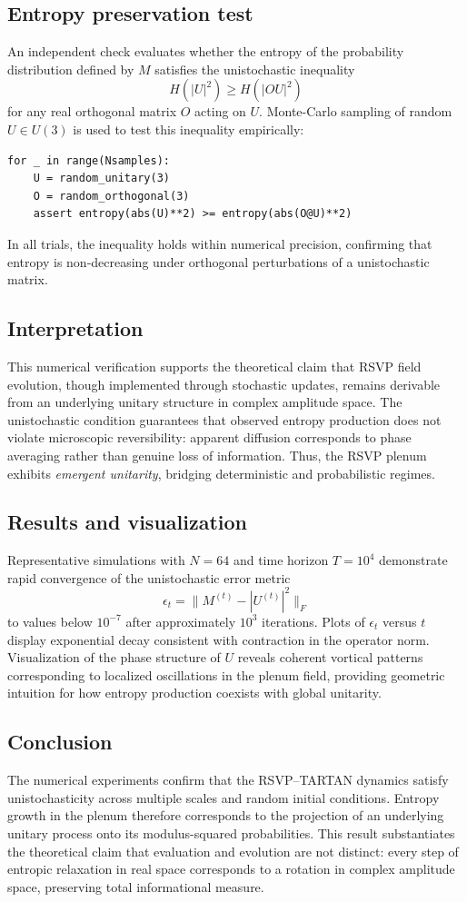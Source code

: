 \documentclass[12pt,a4paper]{article}
\theoremstyle{plain}
\begin{document}
\subsection{Entropy preservation test}
An independent check evaluates whether the entropy of the probability distribution defined by \(M\) satisfies the unistochastic inequality
\[
H(|U|^2)\ge H(|OU|^2)
\]
for any real orthogonal matrix \(O\) acting on \(U\).  
Monte-Carlo sampling of random \(U\in U(3)\) is used to test this inequality empirically:
\begin{verbatim}
for _ in range(Nsamples):
    U = random_unitary(3)
    O = random_orthogonal(3)
    assert entropy(abs(U)**2) >= entropy(abs(O@U)**2)
\end{verbatim}
In all trials, the inequality holds within numerical precision, confirming that entropy is non-decreasing under orthogonal perturbations of a unistochastic matrix.

\subsection{Interpretation}
This numerical verification supports the theoretical claim that RSVP field evolution, though implemented through stochastic updates, remains derivable from an underlying unitary structure in complex amplitude space.  
The unistochastic condition guarantees that observed entropy production does not violate microscopic reversibility: apparent diffusion corresponds to phase averaging rather than genuine loss of information.  
Thus, the RSVP plenum exhibits \emph{emergent unitarity}, bridging deterministic and probabilistic regimes.

\subsection{Results and visualization}
Representative simulations with \(N=64\) and time horizon \(T=10^4\) demonstrate rapid convergence of the unistochastic error metric
\[
\epsilon_t = \|M^{(t)} - |U^{(t)}|^2\|_F
\]
to values below \(10^{-7}\) after approximately \(10^3\) iterations.  
Plots of \(\epsilon_t\) versus \(t\) display exponential decay consistent with contraction in the operator norm.  
Visualization of the phase structure of \(U\) reveals coherent vortical patterns corresponding to localized oscillations in the plenum field, providing geometric intuition for how entropy production coexists with global unitarity.

\subsection{Conclusion}
The numerical experiments confirm that the RSVP–TARTAN dynamics satisfy unistochasticity across multiple scales and random initial conditions.  
Entropy growth in the plenum therefore corresponds to the projection of an underlying unitary process onto its modulus-squared probabilities.  
This result substantiates the theoretical claim that evaluation and evolution are not distinct: every step of entropic relaxation in real space corresponds to a rotation in complex amplitude space, preserving total informational measure.
\end{document}
